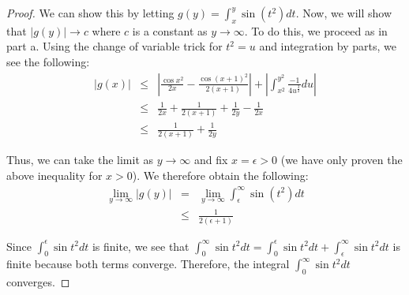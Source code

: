 \documentclass[psamsfonts]{amsart}
\theoremstyle{definition}
\theoremstyle{remark}
\numberwithin{equation}{section}
\begin{document}
\begin{proof}
We can show this by letting $g(y) = \int_x^y \sin(t^2) dt$. Now, we will show that $|g(y)| \to c$ where $c$ is a constant as $y \to \infty$. To do this, we proceed as in part a. Using the change of variable trick for $t^2 = u$ and integration by parts, we see the following:
\begin{eqnarray}
|g(x)| &\leq & \left| \frac{\cos x^2}{2x} - \frac{ \cos (x+1)^2}{2(x+1)}  \right| + \left| \int_{x^2}^{y^2} \frac{-1}{4 u^{\frac{3}{2}}} du \right| \\
&\leq& \frac{1}{2x} + \frac{1}{2(x+1)} + \frac{1}{2y} - \frac{1}{2x} \\
&\leq& \frac{1}{2(x+1)} + \frac{1}{2y}
\end{eqnarray}

Thus, we can take the limit as $y \to \infty$ and fix $x = \epsilon > 0$ (we have only proven the above inequality for $x > 0$). We therefore obtain the following:
\begin{eqnarray}
\lim_{y \to \infty} |g(y)| &=& \lim_{y \to \infty} \int_\epsilon^{\infty} \sin(t^2) dt \\
&\leq& \frac{1}{2(\epsilon + 1)}  
\end{eqnarray}

Since $\int_0^\epsilon \sin t^2 dt$ is finite, we see that $\int_0^\infty \sin t^2 dt = \int_0^\epsilon \sin t^2 dt + \int_\epsilon^\infty \sin t^2 dt$ is finite because both terms converge. Therefore, the integral $\int_0^\infty \sin t^2 dt$ converges. 

\end{proof}
\end{document}
